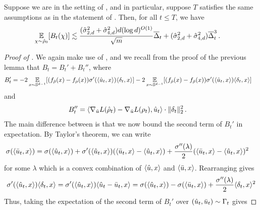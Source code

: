 \begin{lemma}\label{lemma:bt_bound_avg}
Suppose we are in the setting of , and in particular, suppose $T$ satisfies the same assumptions as in the statement of . Then, for all $t \leq T$, we have
\begin{align}
\operatorname*{\mathbb{E}}_{\chi \sim {\hat{\rho}}_0} [B_t(\chi)] 
& \lesssim \frac{(\hat{\sigma}_{2, d}^2 + \hat{\sigma}_{4, d}^2) d (\log d)^{O(1)}}{\sqrt{m}} \overline{\Delta}_t + (\hat{\sigma}_{2, d}^2 + \hat{\sigma}_{4, d}^2) \overline{\Delta}_t^3 \,.
\end{align}
\end{lemma}
\begin{proof}[Proof of ]
We again make use of , and we recall from the proof of the previous lemma that $B_t = B_t' + B_t''$, where
\begin{align}
B_t'
& = -2 \operatorname*{\mathbb{E}}_{x \sim \mathbb{S}^{d - 1}} [(f_{{\bar{\rho}}}(x) - f_\rho(x)) \sigma'(\langle \hat{u}_t, x \rangle) \langle \delta_t, x \rangle] -2 \operatorname*{\mathbb{E}}_{x \sim \mathbb{S}^{d - 1}} [(f_{{\hat{\rho}}}(x) - f_{{\bar{\rho}}}(x)) \sigma'(\langle \hat{u}_t, x \rangle) \langle \delta_t, x \rangle] 
\end{align}
and
\begin{align}
B_t'' 
& = \langle \nabla_{\hat{u}} L({\hat{\rho}}_t) - \nabla_{\hat{u}} L(\rho_t), \hat{u}_t \rangle \cdot \|\delta_t\|_2^2 \,.
\end{align}
The main difference between  is that we now bound the second term of $B_t'$ in expectation. By Taylor's theorem, we can write
\begin{align}
\sigma(\langle \bar{u}_t, x \rangle)
& = \sigma(\langle \hat{u}_t, x \rangle) + \sigma'(\langle \hat{u}_t, x \rangle) (\langle \bar{u}_t, x \rangle - \langle \hat{u}_t, x \rangle) + \frac{\sigma''(\lambda)}{2} (\langle \bar{u}_t, x \rangle - \langle \hat{u}_t, x \rangle)^2
\end{align}
for some $\lambda$ which is a convex combination of $\langle \hat{u}, x \rangle$ and $\langle \bar{u}, x \rangle$. Rearranging gives
\begin{align} \label{eq:taylor_to_complete_square}
\sigma'(\langle \hat{u}_t, x \rangle) \langle \delta_t, x \rangle
= \sigma'(\langle \hat{u}_t, x \rangle) \langle \hat{u}_t - \bar{u}_t, x \rangle
= \sigma(\langle \hat{u}_t, x \rangle) - \sigma(\langle \bar{u}_t, x \rangle) + \frac{\sigma''(\lambda)}{2} \langle \delta_t, x \rangle^2
\end{align}
Thus, taking the expectation of the second term of $B_t'$ over $(\hat{u}_t, \bar{u}_t) \sim \Gamma_t$ gives

\end{proof}
